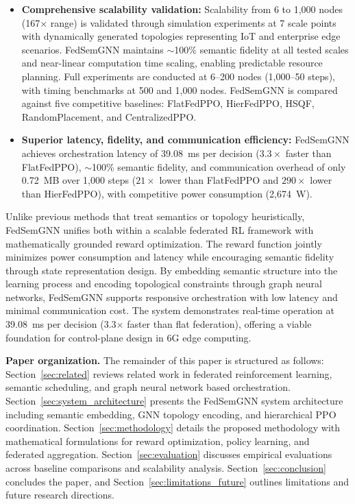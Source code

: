 \documentclass[conference]{IEEEtran}
\begin{document}
\begin{itemize}
		\item \textbf{Comprehensive scalability validation:} Scalability from 6 to 1{,}000 nodes (167$\times$ range) is validated through simulation experiments at 7 scale points with dynamically generated topologies representing IoT and enterprise edge scenarios. FedSemGNN maintains ${\sim}$100\% semantic fidelity at all tested scales and near-linear computation time scaling, enabling predictable resource planning. Full experiments are conducted at 6--200 nodes (1{,}000--50 steps), with timing benchmarks at 500 and 1{,}000 nodes. FedSemGNN is compared against five competitive baselines: FlatFedPPO, HierFedPPO, HSQF, RandomPlacement, and CentralizedPPO.
		
		\item \textbf{Superior latency, fidelity, and communication efficiency:} FedSemGNN achieves orchestration latency of 39.08~ms per decision ($3.3\times$ faster than FlatFedPPO), $\sim$100\% semantic fidelity, and communication overhead of only 0.72~MB over 1{,}000 steps ($21\times$ lower than FlatFedPPO and $290\times$ lower than HierFedPPO), with competitive power consumption (2{,}674~W).
	\end{itemize}
	
	Unlike previous methods that treat semantics or topology heuristically, FedSemGNN unifies both within a scalable federated RL framework with mathematically grounded reward optimization. The reward function jointly minimizes power consumption and latency while encouraging semantic fidelity through state representation design. By embedding semantic structure into the learning process and encoding topological constraints through graph neural networks, FedSemGNN supports responsive orchestration with low latency and minimal communication cost. The system demonstrates real-time operation at 39.08~ms per decision (3.3$\times$ faster than flat federation), offering a viable foundation for control-plane design in 6G edge computing.
	
	\noindent\textbf{Paper organization.} The remainder of this paper is structured as follows: Section~\ref{sec:related} reviews related work in federated reinforcement learning, semantic scheduling, and graph neural network based orchestration. Section~\ref{sec:system_architecture} presents the FedSemGNN system architecture including semantic embedding, GNN topology encoding, and hierarchical PPO coordination. Section~\ref{sec:methodology} details the proposed methodology with mathematical formulations for reward optimization, policy learning, and federated aggregation. Section~\ref{sec:evaluation} discusses empirical evaluations across baseline comparisons and scalability analysis. Section~\ref{sec:conclusion} concludes the paper, and Section~\ref{sec:limitations_future} outlines limitations and future research directions.
	
\end{document}
